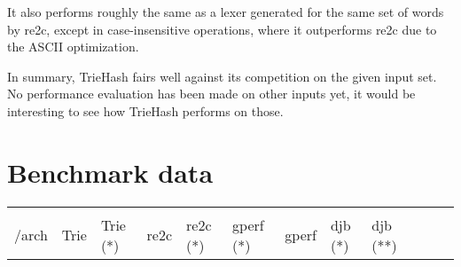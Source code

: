 \documentclass[parskip=half]{scrartcl}
\begin{document}
It also performs roughly the same as a lexer generated for the same set of
words by re2c, except in case-insensitive operations, where it outperforms
re2c due to the ASCII optimization.

In summary, TrieHash fairs well against its competition on the given input
set. No performance evaluation has been made on other inputs yet, it would
be interesting to see how TrieHash performs on those.



    
    

\clearpage
\appendix{}
\section{Benchmark data}
\begin{table}[h]
\begin{tabular}{@{}llllllllllll@{}}
\toprule
\begin{minipage}[b]{0.12\columnwidth}\raggedright\strut
function\\/arch\strut
\end{minipage} & \begin{minipage}[b]{0.05\columnwidth}\raggedright\strut
Trie\strut
\end{minipage} & \begin{minipage}[b]{0.05\columnwidth}\raggedright\strut
Trie (*)\strut
\end{minipage} & \begin{minipage}[b]{0.05\columnwidth}\raggedright\strut
re2c\strut
\end{minipage} & \begin{minipage}[b]{0.05\columnwidth}\raggedright\strut
re2c (*)\strut
\end{minipage} & \begin{minipage}[b]{0.05\columnwidth}\raggedright\strut
gperf (*)\strut
\end{minipage} & \begin{minipage}[b]{0.05\columnwidth}\raggedright\strut
gperf\strut
\end{minipage} & \begin{minipage}[b]{0.05\columnwidth}\raggedright\strut
djb (*)\strut
\end{minipage} & \begin{minipage}[b]{0.05\columnwidth}\raggedright\strut
djb (**)\strut
\end{minipage} & \begin{minipage}[b]{0.05\columnwidth}\raggedright\strut

\end{minipage}
\end{tabular}
\end{table}
\end{document}
